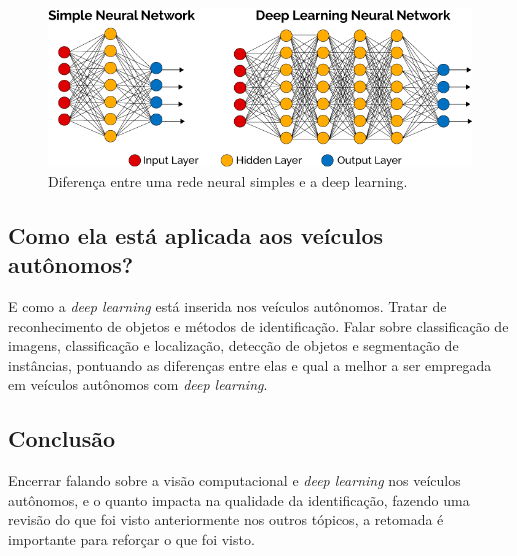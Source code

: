 \documentclass[12pt,a4paper]{article}
\begin{document}
    \begin{figure}[H]
        \centering
        \includegraphics[scale=0.5]{dp_works.png}
        \caption{Diferença entre uma rede neural simples e a deep learning.}
        \label{fig:dp_works}
    \end{figure}
    


    \subsection{Como ela está aplicada aos veículos autônomos?}
    \par E como a \emph{deep learning} está inserida nos veículos autônomos. Tratar de reconhecimento de objetos e métodos de identificação. Falar sobre classificação de imagens, classificação e localização, detecção de objetos e segmentação de instâncias, pontuando as diferenças entre elas e qual a melhor a ser empregada em veículos autônomos com \emph{deep learning}.



    \subsection{Conclusão}
    \par Encerrar falando sobre a visão computacional e \emph{deep learning} nos veículos autônomos, e o quanto impacta na qualidade da identificação, fazendo uma revisão do que foi visto anteriormente nos outros tópicos, a retomada é importante para reforçar o que foi visto.
\end{document}
